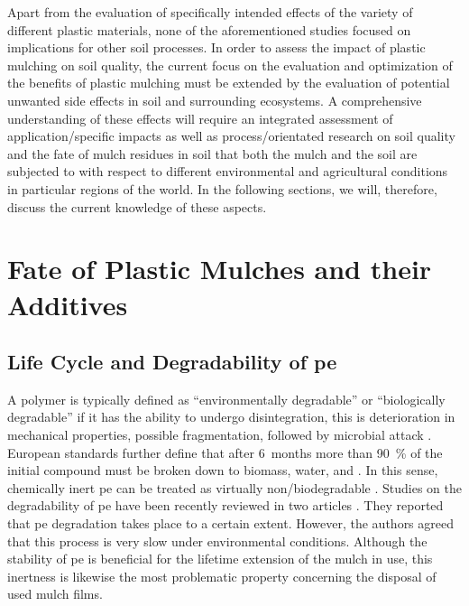 Apart from the evaluation of specifically intended effects of the variety of different plastic materials, none of the aforementioned studies focused on implications for other soil processes. In order to assess the impact of plastic mulching on soil quality, the current focus on the evaluation and optimization of the benefits of plastic mulching must be extended by the evaluation of potential unwanted side effects in soil and surrounding ecosystems. A comprehensive understanding of these effects will require an integrated assessment of application\-/specific impacts as well as process\-/orientated research on soil quality and the fate of mulch residues in soil that both the mulch and the soil are subjected to with respect to different environmental and agricultural conditions in particular regions of the world. In the following sections, we will, therefore, discuss the current knowledge of these aspects.

\section{Fate of Plastic Mulches and their Additives}
\label{sec:plastic-mulching:fate}

\subsection{Life Cycle and Degradability of \Acs{pe}}
\label{sec:plastic-mulching:life-cycle}

A polymer is typically defined as ``environmentally degradable'' or ``biologically degradable'' if it has the ability to undergo disintegration, this is deterioration in mechanical properties, possible fragmentation, followed by microbial attack \citep{KrzanStandardization2006}. European standards further define that after \num{6}~months more than \SI{90}{\percent} of the initial compound must be broken down to biomass, water, and  \citep{DINEN13432Packaging2000}. In this sense, chemically inert \ac{pe} can be treated as virtually non\-/biodegradable \citep{AlbertssonMechanism1987}. Studies on the degradability of \ac{pe} have been recently reviewed in two articles \citep{KruegerProspects2015,Restrepo-FlorezMicrobial2014}. They reported that \ac{pe} degradation takes place to a certain extent. However, the authors agreed that this process is very slow under environmental conditions. Although the stability of \ac{pe} is beneficial for the lifetime extension of the mulch in use, this inertness is likewise the most problematic property concerning the disposal of used mulch films.

